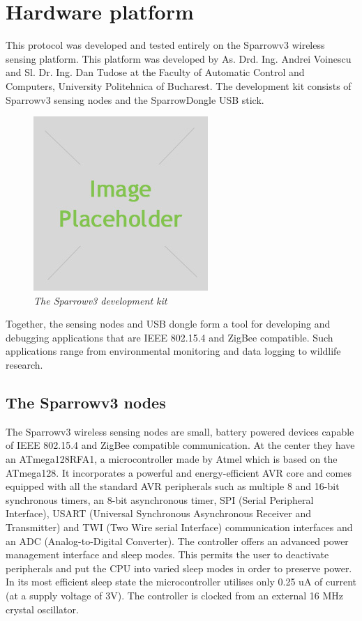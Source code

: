 
\chapter{Hardware platform}

This protocol was developed and tested entirely on the Sparrowv3 wireless
sensing platform. This platform was developed by As. Drd. Ing. Andrei Voinescu 
and Sl. Dr. Ing. Dan Tudose at the Faculty of Automatic Control and Computers, 
University Politehnica of Bucharest. The development kit consists of Sparrowv3 
sensing nodes and the SparrowDongle USB stick.

\begin{figure}[ht]
	\begin{center}
		\includegraphics{img/placeholder.jpg}
	\end{center}
	\caption{\small \itshape{The Sparrowv3 development kit}}
\end{figure}

Together, the sensing nodes and USB dongle form a tool for developing and
debugging applications that are IEEE 802.15.4 and ZigBee compatible. Such
applications range from environmental monitoring and data logging to wildlife
research.

\section{The Sparrowv3 nodes}

The Sparrowv3 wireless sensing nodes are small, battery powered devices capable
of IEEE 802.15.4 and ZigBee compatible communication. At the center they have
an \mbox{ATmega128RFA1}, a microcontroller made by Atmel which is based on the
\mbox{ATmega128}. It incorporates a powerful and energy-efficient AVR
core and comes equipped with all the standard AVR peripherals such as multiple 
8 and 16-bit synchronous timers, an 8-bit asynchronous timer, SPI (Serial
Peripheral Interface), USART (Universal Synchronous Asynchronous Receiver
and Transmitter) and TWI (Two Wire serial Interface) communication interfaces 
and an ADC (Analog-to-Digital Converter). The controller offers an advanced power 
management interface and sleep modes. This permits the user to deactivate 
peripherals and put the CPU into varied sleep modes in order to preserve 
power. In its most efficient sleep state the microcontroller utilises only 
0.25 uA of current (at a supply voltage of 3V). The controller is clocked from an
external 16 MHz crystal oscillator.

